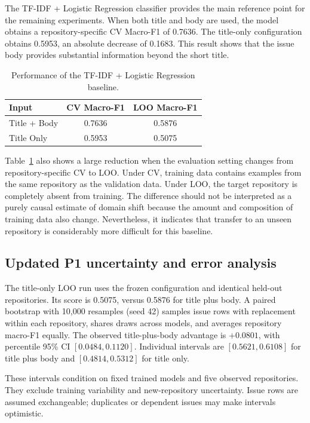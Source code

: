 The TF-IDF + Logistic Regression classifier provides the main reference point for the remaining experiments. When both title and body are used, the model obtains a repository-specific CV Macro-F1 of 0.7636. The title-only configuration obtains 0.5953, an absolute decrease of 0.1683. This result shows that the issue body provides substantial information beyond the short title.

\begin{table}[H]
\centering
\caption{Performance of the TF-IDF + Logistic Regression baseline.}
\label{tab:baseline-results}
\begin{tabular}{lcc}
\toprule
\textbf{Input} & \textbf{CV Macro-F1} & \textbf{LOO Macro-F1} \\
\midrule
Title + Body & 0.7636 & 0.5876 \\
Title Only & 0.5953 & 0.5075 \\
\bottomrule
\end{tabular}
\end{table}

Table~\ref{tab:baseline-results} also shows a large reduction when the evaluation setting changes from repository-specific CV to LOO. Under CV, training data contains examples from the same repository as the validation data. Under LOO, the target repository is completely absent from training. The difference should not be interpreted as a purely causal estimate of domain shift because the amount and composition of training data also change. Nevertheless, it indicates that transfer to an unseen repository is considerably more difficult for this baseline.

\subsection*{Updated P1 uncertainty and error analysis}
The title-only LOO run uses the frozen configuration and identical held-out repositories. Its score is 0.5075, versus 0.5876 for title plus body. A paired bootstrap with 10,000 resamples (seed 42) samples issue rows with replacement within each repository, shares draws across models, and averages repository macro-F1 equally. The observed title-plus-body advantage is $+0.0801$, with percentile 95\% CI $[0.0484,0.1120]$. Individual intervals are $[0.5621,0.6108]$ for title plus body and $[0.4814,0.5312]$ for title only.

These intervals condition on fixed trained models and five observed repositories. They exclude training variability and new-repository uncertainty. Issue rows are assumed exchangeable; duplicates or dependent issues may make intervals optimistic.


